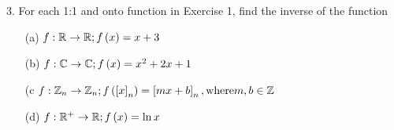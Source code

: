 \newpage
\begin{mdframed}[style=darkQuesion]
  3.   For each 1:1 and onto function in Exercise 1, find the inverse of the
  function
  \begin{itemize}
    \item [(a)]{
          $f:\mathbb{R}\to \mathbb{R}; f\left(x\right)=x+3$
          }
    \item [(b)]{
          $f:\mathbb{C}\to \mathbb{C}; f\left(x\right)=x^2+2x+1$
          }
    \item [(c]{
          $f:\mathbb{Z}_n\to \mathbb{Z}_n; f\left(\left[x\right]_n\right)=\left[mx+b\right]_n, \text{where} m,b\in \mathbb{Z}$
          }
    \item [(d)]{
          $f:\mathbb{R}^+\to \mathbb{R}; f\left(x\right)=\ln x$
          }
  \end{itemize}
\end{mdframed}


